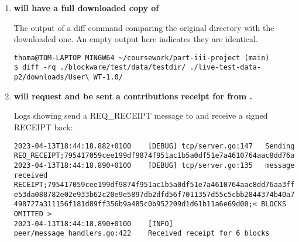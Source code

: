 \begin{enumerate}[itemsep=2.5pt]
  \item \textbf{ will have a full downloaded copy of }
  
  The output of a diff command comparing the original directory with the downloaded one. An empty output here indicates they are identical.

\begin{lstlisting}[breaklines=true, postbreak=\mbox{\textcolor{red}{$\hookrightarrow$}\space}]
thoma@TOM-LAPTOP MINGW64 ~/coursework/part-iii-project (main)
$ diff -rq ./blockware/test/data/testdir/ ./live-test-data-p2/downloads/User\ WT-1.0/

\end{lstlisting}

  \item \textbf{ will request and be sent a contributions receipt for  from .}
  
  Logs showing  send a REQ\_RECEIPT message to  and receive a signed RECEIPT back:

\begin{lstlisting}[breaklines=true, postbreak=\mbox{\textcolor{red}{$\hookrightarrow$}\space}]
2023-04-13T18:44:18.882+0100	[DEBUG]	tcp/server.go:147	Sending REQ_RECEIPT;795417059cee199df9874f951ac1b5a0df51e7a4610764aac8dd76aa3ff27664
2023-04-13T18:44:18.890+0100	[DEBUG]	tcp/server.go:135	message received RECEIPT;795417059cee199df9874f951ac1b5a0df51e7a4610764aac8dd76aa3ff27664; e53da088782e02e933b62c20e9e5897db2dfd56f7011357d55c5cbb2844374b40a77186ca2 498727a311156f181d89ff356b9a485c0b952209d1d61b11a6e69d00;< BLOCKS OMITTED >
2023-04-13T18:44:18.890+0100	[INFO]	peer/message_handlers.go:422	Received receipt for 6 blocks
\end{lstlisting}

\end{enumerate}

\begin{lstlisting}[breaklines=true, postbreak=\mbox{\textcolor{red}{$\hookrightarrow$}\space}]
  
\end{lstlisting}